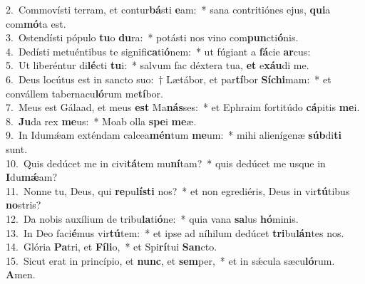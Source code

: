 {2.~}Commovísti terram, et contur\textbf{bá}sti \textbf{e}am:~* sana contritiónes ejus, \textbf{qui}a com\textbf{mó}ta est.\\
{3.~}Ostendísti pópulo \textbf{tu}o \textbf{du}ra:~* potásti nos vino com\textbf{pun}cti\textbf{ó}nis.\\
{4.~}Dedísti metuéntibus te signifi\textbf{ca}ti\textbf{ó}nem:~* ut fúgiant a \textbf{fá}cie \textbf{ar}cus:\\
{5.~}Ut liberéntur di\textbf{lé}cti \textbf{tu}i:~* salvum fac déxtera tua, \textbf{et} e\textbf{xáu}di me.\\
{6.~}Deus locútus est in sancto suo:~† Lætábor, et par\textbf{tí}bor \textbf{Sí}\textbf{chi}mam:~* et convállem tabernacu\textbf{ló}rum me\textbf{tí}bor.\\
{7.~}Meus est Gálaad, et meus \textbf{est} Ma\textbf{nás}ses:~* et Ephraim fortitúdo \textbf{cá}pitis \textbf{me}i.\\
{8.~}\textbf{Ju}da rex \textbf{me}us:~* Moab olla \textbf{spe}i \textbf{me}æ.\\
{9.~}In Idumǽam exténdam calcea\textbf{mén}tum \textbf{me}um:~* mihi alienígenæ \textbf{súb}di\textbf{ti} sunt.\\
{10.~}Quis dedúcet me in civi\textbf{tá}tem mu\textbf{ní}tam?~* quis dedúcet me usque in \textbf{I}du\textbf{mǽ}am?\\
{11.~}Nonne tu, Deus, qui \textbf{re}pu\textbf{lí}\textbf{sti} nos?~* et non egrediéris, Deus in vir\textbf{tú}tibus \textbf{no}stris?\\
{12.~}Da nobis auxílium de tribu\textbf{la}ti\textbf{ó}ne:~* quia vana \textbf{sa}lus \textbf{hó}minis.\\
{13.~}In Deo faci\textbf{é}mus vir\textbf{tú}tem:~* et ipse ad níhilum dedúcet \textbf{tri}bu\textbf{lán}tes nos.\\
{14.~}Glória \textbf{Pa}tri, et \textbf{Fí}\textbf{li}o,~* et Spi\textbf{rí}tui \textbf{San}cto.\\
{15.~}Sicut erat in princípio, et \textbf{nunc}, et \textbf{sem}per,~* et in sǽcula sæcu\textbf{ló}rum. \textbf{A}men.\\

